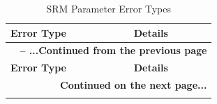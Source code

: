 \documentclass[main\_\_EN.tex]{subfiles}
\begin{document}
\begin{longtable}[c]{ |p{6cm}|p{10cm}| }
    \caption{SRM Parameter Error Types}
    \label{tab:srm_param_err}\\\hline

    \rowcolor{lightgray}
    \textbf{Error Type} & \textbf{Details} \\\hline
    \endfirsthead


    \multicolumn{2}{c}{\bfseries \tablename\ \thetable{} -- ...Continued from the previous page}\\\hline
    \rowcolor{lightgray}
    \textbf{Error Type} & \textbf{Details} \\\hline
    \endhead

    \multicolumn{2}{r}{\textbf{Continued on the next page...}} \\
    \endfoot

    \endlastfoot


\end{longtable}
\end{document}
